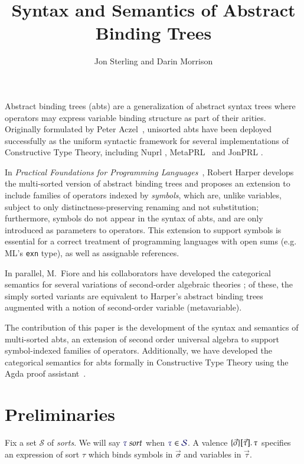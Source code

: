 \documentclass[11pt]{article}
\theoremstyle{definition}
\theoremstyle{remark}
\numberwithin{equation}{section}
\def\IModeColorName{MidnightBlue}
\newcommand\IMode[1]{{\color{\IModeColorName}{#1}}}
\newcommand\Member[2]{\IMode{#1}\in\IMode{#2}}
\newcommand\MkValence[3]{%
  \ifthenelse{\equal{#1}{}}{}{%
    \{#1\}%
  }%
  \ifthenelse{\equal{#2}{}}{}{%
    [#2]%
  }.\, #3%
}
\newcommand\IsSort[1]{\IMode{#1}\ \textit{sort}}
\newcommand\Sorts{\mathcal{S}}
\begin{document}
\title{Syntax and Semantics of Abstract Binding Trees}
\date{}
\author{Jon Sterling and Darin Morrison}
\maketitle

Abstract binding trees (abts) are a generalization of abstract syntax trees
where operators may express variable binding structure as part of their
arities.  Originally formulated by Peter Aczel~\cite{aczel:1978}, unisorted
abts have been deployed successfully as the uniform syntactic framework for
several implementations of Constructive Type Theory, including Nuprl
\cite{constable:1986}, MetaPRL~\cite{hickey:2003} and JonPRL
\cite{jonprl:2015}.

In \emph{Practical Foundations for Programming Languages}~\cite{harper:2016},
Robert Harper develops the multi-sorted version of abstract binding trees and
proposes an extension to include families of operators indexed by
\emph{symbols}, which are, unlike variables, subject to only
distinctness-preserving renaming and not substitution; furthermore, symbols do
not appear in the syntax of abts, and are only introduced as parameters to
operators. This extension to support symbols is essential for a
correct treatment of programming languages with open sums (e.g. ML's
\texttt{exn} type), as well as assignable references.

In parallel, M.\ Fiore and his collaborators have developed the categorical
semantics for several variations of second-order algebraic theories
\cite{fiore:1999, fiore:2005, fiore-hur:2010, fiore-mamoud:2010}; of these, the
simply sorted variants are equivalent to Harper's abstract binding trees
augmented with a notion of second-order variable (metavariable).

The contribution of this paper is the development of the syntax and semantics
of multi-sorted abts, an extension of second order universal
algebra to support symbol-indexed families of operators. Additionally, we have
developed the categorical semantics for abts formally in Constructive
Type Theory using the Agda proof assistant~\cite{norell:2007}.

\section{Preliminaries}

Fix a set $\Sorts$ of \emph{sorts}. We will say $\IsSort{\tau}$ when
$\Member{\tau}{\Sorts}$. A valence $\MkValence{\vec{\sigma}}{\vec{\tau}}{\tau}$ specifies an
expression of sort $\tau$ which binds symbols in $\vec{\sigma}$ and variables in
$\vec{\tau}$.
\end{document}
